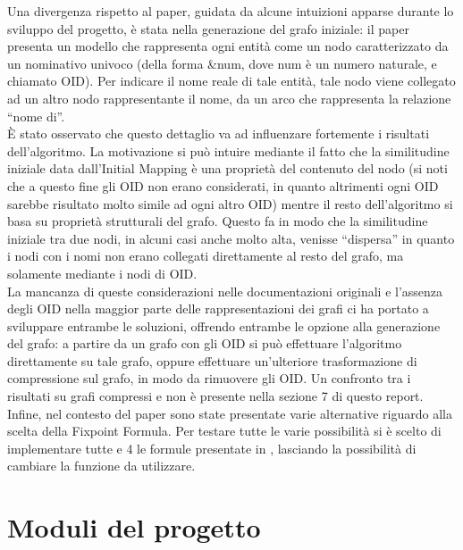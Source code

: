 \documentclass[a4paper,10pt]{article}
\begin{document}
Una divergenza rispetto al paper, guidata da alcune intuizioni apparse durante lo sviluppo del progetto, è stata nella generazione del grafo iniziale: il paper presenta un modello che rappresenta ogni entità come un nodo caratterizzato da un nominativo univoco (della forma \&num, dove num è un numero naturale, e chiamato OID). Per indicare il nome reale di tale entità, tale nodo viene collegato ad un altro nodo rappresentante il nome, da un arco che rappresenta la relazione “nome di”. \\

È stato osservato che questo dettaglio va ad influenzare fortemente i risultati dell’algoritmo. La motivazione si può intuire mediante il fatto che la similitudine iniziale data dall’Initial Mapping è una proprietà del contenuto del nodo (si noti che a questo fine gli OID non erano considerati, in quanto altrimenti ogni OID sarebbe risultato molto simile ad ogni altro OID) mentre il resto dell’algoritmo si basa su proprietà strutturali del grafo. Questo fa in modo che la similitudine iniziale tra due nodi, in alcuni casi anche molto alta, venisse “dispersa” in quanto i nodi con i nomi non erano collegati direttamente al resto del grafo, ma solamente mediante i nodi di OID.\\

La mancanza di queste considerazioni nelle documentazioni originali e l'assenza degli OID nella maggior parte delle rappresentazioni dei grafi ci ha portato a sviluppare entrambe le soluzioni, offrendo entrambe le opzione alla generazione del grafo: a partire da un grafo con gli OID si può effettuare l’algoritmo direttamente su tale grafo, oppure effettuare un’ulteriore trasformazione di compressione sul grafo, in modo da rimuovere gli OID. Un confronto tra i risultati su grafi compressi e non è presente nella sezione 7 di questo report.\\

Infine, nel contesto del paper sono state presentate varie alternative riguardo alla scelta della Fixpoint Formula. Per testare tutte le varie possibilità si è scelto di implementare tutte e 4 le formule presentate in \citep{sfpaper_ext}, lasciando la possibilità di cambiare la funzione da utilizzare.



\section{Moduli del progetto}
\end{document}
